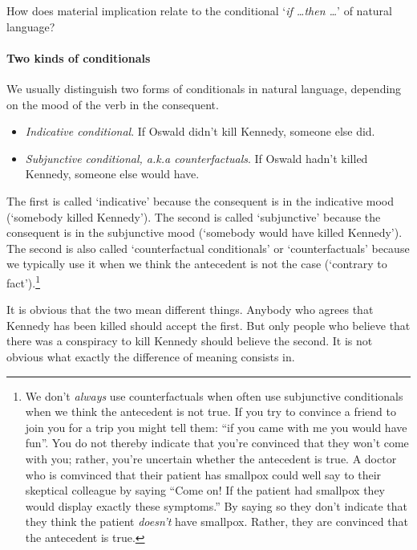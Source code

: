 \documentclass[../../../include/open-logic-section]{subfiles}
\begin{document}


How does material implication relate to the conditional `\emph{if \ldots then \ldots}' of natural language?

\paragraph*{Two kinds of conditionals}

We usually distinguish two forms of conditionals in natural language, depending on the mood of the verb in the consequent.

\begin{itemize}
	\item \emph{Indicative conditional}. If Oswald didn't kill Kennedy, someone else did.
	\item \emph{Subjunctive conditional, a.k.a counterfactuals}. If Oswald hadn't killed Kennedy, someone else would have.
\end{itemize}

The first is called `indicative' because the consequent is in the indicative mood (`somebody killed Kennedy'). The second is called `subjunctive' because the consequent is in the subjunctive mood (`somebody would have killed Kennedy'). The second is also called `counterfactual conditionals' or `counterfactuals' because we typically use it when we think the antecedent is not the case (`contrary to fact').\footnote{We don't \emph{always} use counterfactuals when often use subjunctive conditionals when we think the antecedent is not true. If you try to convince a friend to join you for a trip you might tell them: ``if you came with me you would have fun''. You do not thereby indicate that you're convinced that they won't come with you; rather, you're uncertain whether the antecedent is true.  A doctor who is comvinced that their patient has smallpox could well say to their skeptical colleague by saying ``Come on! If the patient had smallpox they would display exactly these symptoms.'' By saying so they don't indicate that they think the patient \emph{doesn't} have smallpox. Rather, they are convinced that the antecedent is true.} 

It is obvious that the two mean different things. Anybody who agrees that Kennedy has been killed should accept the first. But only people who believe that there was a conspiracy to kill Kennedy should believe the second. It is not obvious what exactly the difference of meaning consists in. 
\end{document}
